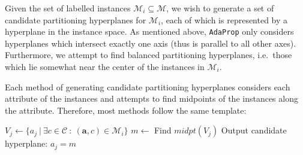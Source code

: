 \documentclass[a4paper,12pt]{report} %
\newcommand{\AdaProp}{\texttt{AdaProp}\xspace}
\newcommand{\mcl}[1]{\mathcal{#1}}
\newcommand{\vect}[1]{\boldsymbol{#1}}
\begin{document}
Given the set of labelled instances $\mcl{M}_i \subseteq \mcl{M}$,
    we wish to generate a set of candidate partitioning hyperplanes for $\mcl{M}_i$,
    each of which is represented by a hyperplane in the instance space.
As mentioned above, 
    \AdaProp only considers hyperplanes 
    which intersect exactly one axis
    (thus is parallel to all other axes).
Furthermore, we attempt to find balanced partitioning hyperplanes, 
    i.e.\ those which lie somewhat near the center of the instances
    in $\mcl{M}_i$.

Each method of generating candidate partitioning hyperplanes 
    considers each attribute of the instances and attempts 
    to find midpoints of the instances along the attribute.
Therefore, most methods follow the same template:
    \begin{algorithmic}
        \State $V_j \gets \{ a_j ~\big|~ \exists c \in \mcl{C} ~:~ (\vect{a},c) \in \mcl{M}_i \}$
        \State $m \gets $ Find $midpt(V_j)$
        \State Output candidate hyperplane: $a_j = m $
    \EndFor
    \end{algorithmic}
        
\end{document}
